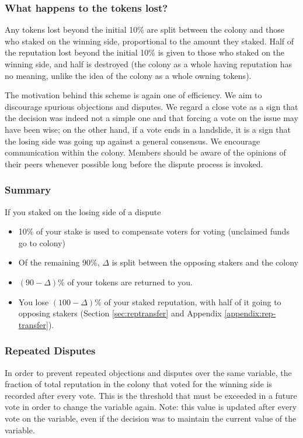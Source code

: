 \subsubsection*{What happens to the tokens lost?}
Any tokens lost beyond the initial 10\% are split between the colony and those who staked on the winning side, proportional to the amount they staked. Half of the reputation lost beyond the initial 10\% is given to those who staked on the winning side, and half is destroyed (the colony as a whole having reputation has no meaning, unlike the idea of the colony as a whole owning tokens).

The motivation behind this scheme is again one of efficiency. We aim to discourage spurious objections and disputes. We regard a close vote as a sign that the decision was indeed not a simple one and that forcing a vote on the issue may have been wise; on the other hand, if a vote ends in a landslide, it is a sign that the losing side was going up against a general consensus. We encourage communication within the colony. Members should be aware of the opinions of their peers whenever possible long before the dispute process is invoked.

\subsubsection*{Summary}
If you staked on the losing side of a dispute
\begin{itemize}
 \item 10\% of your stake is used to compensate voters for voting (unclaimed funds go to colony)
 \item Of the remaining 90\%, $\Delta$ is split between the opposing stakers and the colony
 \item $(90-\Delta)\%$ of your tokens are returned to you.
 \item You lose $(100-\Delta)\%$ of your staked reputation, with half of it going to opposing stakers (Section \ref{sec:reptransfer} and Appendix \ref{appendix:rep-transfer}).
\end{itemize}


\subsubsection{Repeated Disputes}\label{sec:repeated-disputes}
In order to prevent repeated objections and disputes over the same variable, the fraction of total reputation in the colony that voted for the winning side is recorded after every vote. This is the threshold that must be exceeded in a future vote in order to change the variable again. Note: this value is updated after every vote on the variable, even if the decision was to maintain the current value of the variable.


